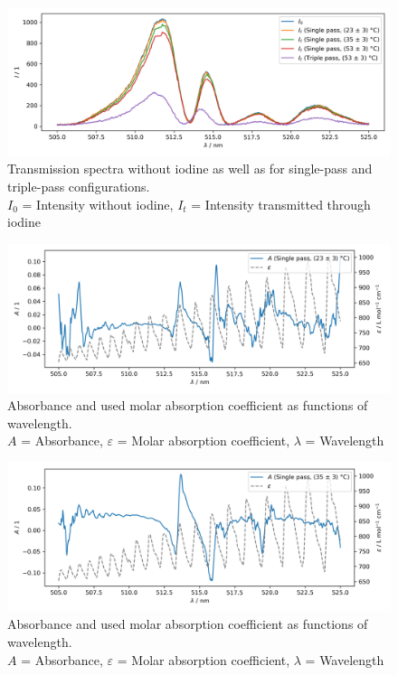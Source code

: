 \begin{figure}[H]
    \centering
    \includegraphics[width=\textwidth]{graphics/transmission.png}
    \caption{Transmission spectra without iodine as well as for single-pass and triple-pass configurations.\\
        $I_0$ = Intensity without iodine, $I_t$ = Intensity transmitted through iodine}
    \label{fig:evaluation:transmission}
\end{figure}

\begin{figure}[H]
    \centering
    \includegraphics[width=\textwidth]{graphics/absorbance-25.png}
    \caption{Absorbance and used molar absorption coefficient as functions of wavelength.\\
        $A$ = Absorbance, $\varepsilon$ = Molar absorption coefficient, $\lambda$ = Wavelength}
    \label{fig:evaluation:absorbance:single:1}
\end{figure}

\begin{figure}[H]
    \centering
    \includegraphics[width=\textwidth]{graphics/absorbance-42.png}
    \caption{Absorbance and used molar absorption coefficient as functions of wavelength.\\
        $A$ = Absorbance, $\varepsilon$ = Molar absorption coefficient, $\lambda$ = Wavelength}
    \label{fig:evaluation:absorbance:single:2}
\end{figure}

